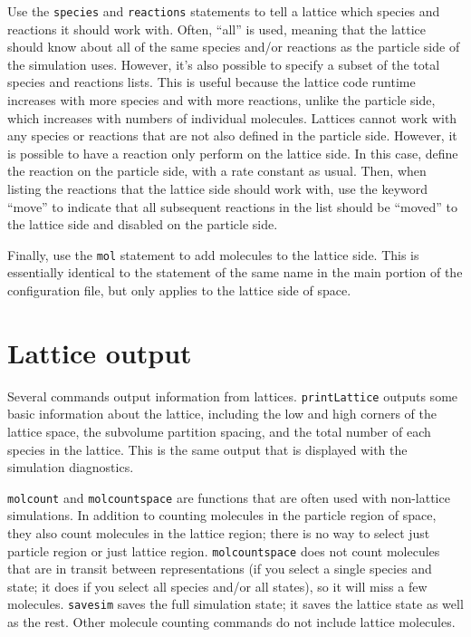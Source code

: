 \documentclass {book}
\newcommand {\ttt} {\texttt}
\begin{document}
Use the \ttt{species} and \ttt{reactions} statements to tell a lattice which species and reactions it should work with. Often, ``all'' is used, meaning that the lattice should know about all of the same species and/or reactions as the particle side of the simulation uses. However, it's also possible to specify a subset of the total species and reactions lists. This is useful because the lattice code runtime increases with more species and with more reactions, unlike the particle side, which increases with numbers of individual molecules. Lattices cannot work with any species or reactions that are not also defined in the particle side. However, it is possible to have a reaction only perform on the lattice side. In this case, define the reaction on the particle side, with a rate constant as usual. Then, when listing the reactions that the lattice side should work with, use the keyword ``move'' to indicate that all subsequent reactions in the list should be ``moved'' to the lattice side and disabled on the particle side.

Finally, use the \ttt{mol} statement to add molecules to the lattice side. This is essentially identical to the statement of the same name in the main portion of the configuration file, but only applies to the lattice side of space.

\section{Lattice output}

Several commands output information from lattices. \ttt{printLattice} outputs some basic information about the lattice, including the low and high corners of the lattice space, the subvolume partition spacing, and the total number of each species in the lattice. This is the same output that is displayed with the simulation diagnostics.

\ttt{molcount} and \ttt{molcountspace} are functions that are often used with non-lattice simulations. In addition to counting molecules in the particle region of space, they also count molecules in the lattice region; there is no way to select just particle region or just lattice region. \ttt{molcountspace} does not count molecules that are in transit between representations (if you select a single species and state; it does if you select all species and/or all states), so it will miss a few molecules. \ttt{savesim} saves the full simulation state; it saves the lattice state as well as the rest. Other molecule counting commands do not include lattice molecules.
\end{document}

